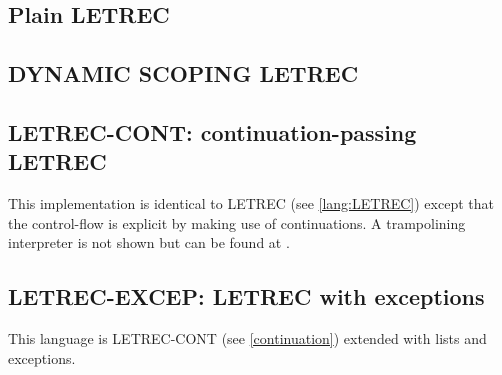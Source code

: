 \documentclass[../codeprint.tex]{subfiles}
\begin{document}
\subsection{Plain LETREC}
\label{lang:LETREC}



\subsection{DYNAMIC SCOPING LETREC}
\label{scoping}




\subsection{LETREC-CONT: continuation-passing LETREC}
\label{continuation}
This implementation is identical to LETREC (see \autoref{lang:LETREC}) except that the control-flow is explicit by making use of continuations. A trampolining interpreter is not shown but can be found at \cite[p.~155-166]{Friedman:2008:EPL:1378240}.


\subsection{LETREC-EXCEP: LETREC with exceptions}
This language is LETREC-CONT (see \autoref{continuation}) extended with lists and exceptions.


\end{document}
